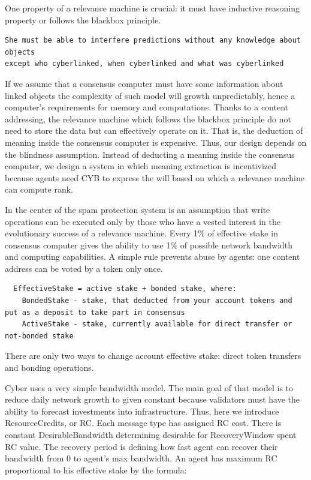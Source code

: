 \documentclass[8pt,oneside]{amsart}
\newcommand{\code}[1]{{\PlayBold #1}}
\begin{document}
One property of a relevance machine is crucial: it must have inductive reasoning property or follows the blackbox principle.

\begin{lstlisting}
She must be able to interfere predictions without any knowledge about objects
except who cyberlinked, when cyberlinked and what was cyberlinked
\end{lstlisting}

If we assume that a consensus computer must have some information about linked objects the complexity of such model will growth unpredictably, hence a computer's requirements for memory and computations. Thanks to a content addressing, the relevance machine which follows the blackbox principle do not need to store the data but can effectively operate on it. That is, the deduction of meaning inside the consensus computer is expensive. Thus, our design depends on the blindness assumption. Instead of deducting a meaning inside the consensus computer, we design a system in which meaning extraction is incentivized because agents need CYB to express the will based on which a relevance machine can compute rank.

In the center of the spam protection system is an assumption that write operations can be executed only by those who have a vested interest in the evolutionary success of a relevance machine. Every 1\% of effective stake in consensus computer gives the ability to use 1\% of possible network bandwidth and computing capabilities. A simple rule prevents abuse by agents: one content address can be voted by a token only once.

\begin{lstlisting}
  EffectiveStake = active stake + bonded stake, where:
    BondedStake - stake, that deducted from your account tokens and put as a deposit to take part in consensus
    ActiveStake - stake, currently available for direct transfer or not-bonded stake
\end{lstlisting}

There are only two ways to change account effective stake: direct token transfers and bonding operations.

Cyber uses a very simple bandwidth model. The main goal of that model is to reduce daily network growth to given constant because validators must have the ability to forecast investments into infrastructure. Thus, here we introduce \code{ResourceCredits}, or RC. Each message type has assigned RC cost. There is constant \code{DesirableBandwidth} determining desirable for \code{RecoveryWindow} spent RC value. The recovery period is defining how fast agent can recover their bandwidth from 0 to agent's max bandwidth. An agent has maximum RC proportional to his effective stake by the formula:
\end{document}
